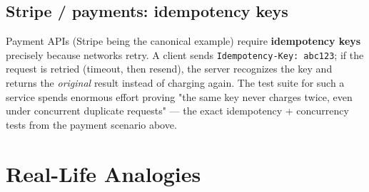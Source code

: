 \documentclass[11pt]{article}
\begin{document}
\subsection{Stripe / payments: idempotency keys}\label{stripe--payments-idempotency-keys}

Payment APIs (Stripe being the canonical example) require \textbf{idempotency keys} precisely because networks retry. A client sends \texttt{Idempotency-Key:\ abc123}; if the request is retried (timeout, then resend), the server recognizes the key and returns the \emph{original} result instead of charging again. The test suite for such a service spends enormous effort proving "the same key never charges twice, even under concurrent duplicate requests" --- the exact idempotency + concurrency tests from the payment scenario above.

\section{Real-Life Analogies}\label{real-life-analogies}
\end{document}
